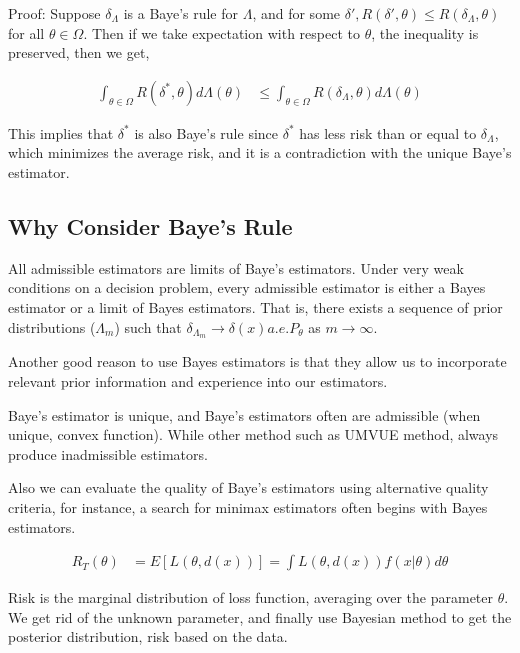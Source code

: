 Proof: Suppose $\delta_{\Lambda}$ is a Baye's rule for $\Lambda$, and for some $\delta', R(\delta', \theta) \leq R(\delta_{\Lambda}, \theta)$ for all $\theta \in \Omega$. Then if we take expectation with respect to $\theta$, the inequality is preserved, then we get,

\begin{align*}
\int_{\theta \in \Omega} R(\delta^{\ast}, \theta) d \Lambda(\theta) & \leq \int_{\theta \in \Omega} R(\delta_{\Lambda}, \theta) d \Lambda(\theta)
\end{align*}

This implies that  $\delta^{\ast}$ is also Baye's rule since $\delta^{\ast}$ has less risk than or equal to $\delta_{\Lambda}$, which minimizes the average risk, and it is a contradiction with the unique Baye's estimator. 


\subsection{Why Consider Baye's Rule}

All admissible estimators are limits of Baye's estimators. Under very weak conditions on a decision problem, every admissible estimator is either a Bayes estimator or a limit of Bayes estimators. That is, there exists a sequence of prior distributions ($\Lambda_m$) such that $\delta_{\Lambda_m} \rightarrow \delta(x) a. e. P_{\theta}$ as $m \rightarrow \infty$. 

Another good reason to use Bayes estimators is that they allow us to incorporate relevant prior information and experience into our estimators. 

Baye's estimator is unique, and Baye's estimators often are admissible (when unique, convex function). While other method such as UMVUE method, always produce inadmissible estimators. 

Also we can evaluate the quality of Baye's estimators using alternative quality criteria, for instance, a search for minimax estimators often begins with Bayes estimators. 


\begin{align*}
R_{T}(\theta) &= E[L(\theta, d(x))] = \int L(\theta, d(x)) f(x| \theta) d\theta
\end{align*}

Risk is the marginal distribution of loss function, averaging over the parameter $\theta$. We get rid of the unknown parameter, and finally use Bayesian method to get the posterior distribution, risk based on the data.

